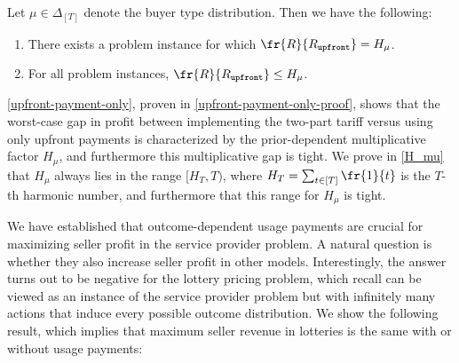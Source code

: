 \begin{proposition} \label{upfront-payment-only}
     Let $\mu \in \Delta_{[T]}$ denote the buyer type distribution. Then we have the following:
    \begin{enumerate}
        \item There exists a problem instance for which $\fr{R}{\Rupfront} = H_\mu$.
        \item For all problem instances, $\fr{R}{\Rupfront} \le H_\mu$.
    \end{enumerate}
\end{proposition}
\cref{upfront-payment-only}, proven in \cref{upfront-payment-only-proof}, shows that the worst-case gap in profit between implementing the two-part tariff versus using only upfront payments is characterized by the prior-dependent multiplicative factor $H_\mu$, and furthermore this multiplicative gap is tight. We prove in \cref{H_mu} that $H_\mu$ always lies in the range $[H_T, T)$, where $H_T = \sum_{t\in [T]} \fr{1}{t}$ is the $T$-th harmonic number, and furthermore that this range for $H_\mu$ is tight.



We have established that outcome-dependent usage payments are crucial for maximizing seller profit in the service provider problem. A natural question is whether they also increase seller profit in other models. Interestingly, the answer turns out to be negative for the lottery pricing problem, which recall can be viewed as an instance of the service provider problem but with infinitely many actions that induce every possible outcome distribution. We show the following result, which implies that maximum seller revenue in lotteries is the same with or without usage payments:

